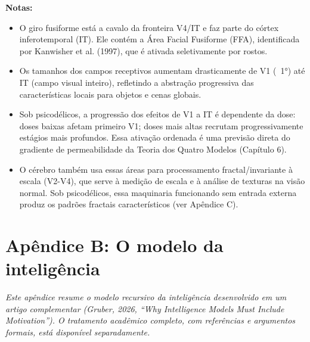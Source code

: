 \documentclass[11pt, twoside, openright]{book}
\begin{document}
\textbf{Notas:}
\begin{itemize}
  \item O giro fusiforme está a cavalo da fronteira V4/\allowbreak{}IT e faz parte do córtex inferotemporal (IT). Ele contém a Área Facial Fusiforme (FFA), identificada por Kanwisher et al. (1997), que é ativada seletivamente por rostos.
  \item Os tamanhos dos campos receptivos aumentam drasticamente de V1 (~1°) até IT (campo visual inteiro), refletindo a abstração progressiva das características locais para objetos e cenas globais.
  \item Sob psicodélicos, a progressão dos efeitos de V1 a IT é dependente da dose: doses baixas afetam primeiro V1; doses mais altas recrutam progressivamente estágios mais profundos. Essa ativação ordenada é uma previsão direta do gradiente de permeabilidade da Teoria dos Quatro Modelos (Capítulo 6).
  \item O cérebro também usa essas áreas para processamento fractal/\allowbreak{}invariante à escala (V2-V4), que serve à medição de escala e à análise de texturas na visão normal. Sob psicodélicos, essa maquinaria funcionando sem entrada externa produz os padrões fractais característicos (ver Apêndice C).
\end{itemize}


\chapter*{Apêndice B: O modelo da inteligência}

\textit{Este apêndice resume o modelo recursivo da inteligência desenvolvido em um artigo complementar (Gruber, 2026, ``Why Intelligence Models Must Include Motivation''). O tratamento acadêmico completo, com referências e argumentos formais, está disponível separadamente.}
\end{document}
